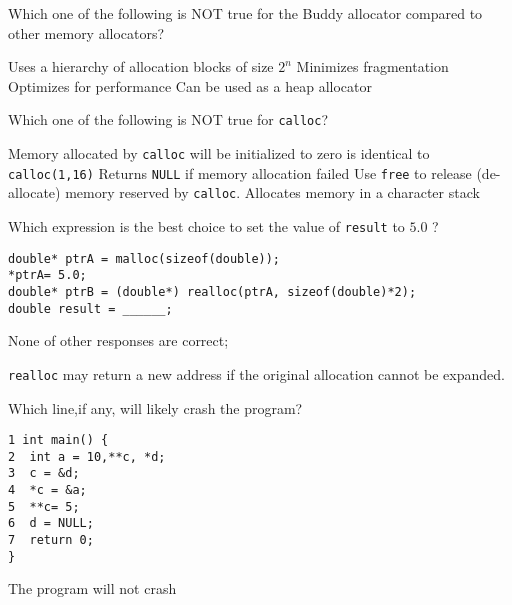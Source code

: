 
\variant
Which one of the following is NOT true for the Buddy allocator compared to other memory allocators?
\begin{answers}
\answer Uses a hierarchy of allocation blocks of size $2^n$
\correctanswer Minimizes fragmentation
\answer Optimizes for performance
\answer Can be used as a heap allocator
\end{answers}
\begin{solution}
\end{solution}

\variant
Which one of the following is NOT true for {\tt calloc}?
\begin{answers}
\answer Memory allocated by {\tt calloc} will be initialized to zero
 is identical to {\tt calloc(1,16)}
\answer Returns {\tt NULL} if memory allocation failed
\answer Use {\tt free} to release (de-allocate) memory reserved by {\tt calloc}.
\correctanswer Allocates memory in a character stack
\end{answers}
\begin{solution}
\end{solution}

\variant
Which expression is the best choice to set the value of {\tt result} to $5.0$ ?
\begin{verbatim}
double* ptrA = malloc(sizeof(double));
*ptrA= 5.0;
double* ptrB = (double*) realloc(ptrA, sizeof(double)*2);
double result = ______;
\end{verbatim}
\begin{answers}
\answer None of other responses are correct;
\end{answers}
\begin{solution}
{\tt realloc} may return a new address if the original allocation cannot be expanded.
\end{solution}


\variant
Which line,if any, will likely crash the program?
\begin{verbatim}
1 int main() {
2  int a = 10,**c, *d;
3  c = &d;
4  *c = &a;
5  **c= 5;
6  d = NULL;
7  return 0;
}
\end{verbatim}
\begin{answers}
\correctanswer The program will not crash
\end{answers}
\begin{solution}
\end{solution}

